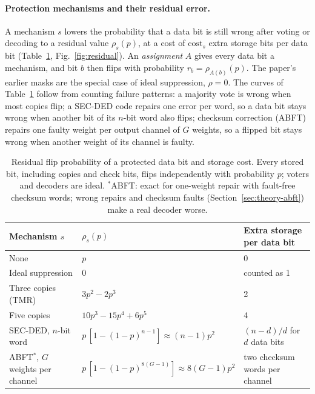 \paragraph{Protection mechanisms and their residual error.} A mechanism $s$ lowers the probability that a data bit is still wrong after voting or decoding to a residual value $\rho_s(p)$, at a cost of $\mathrm{cost}_s$ extra storage bits per data bit (Table~\ref{tab:mechanisms}, Fig.~\ref{fig:residual}). An \emph{assignment} $A$ gives every data bit a mechanism, and bit $b$ then flips with probability $r_b=\rho_{A(b)}(p)$. The paper's earlier masks are the special case of ideal suppression, $\rho=0$. The curves of Table~\ref{tab:mechanisms} follow from counting failure patterns: a majority vote is wrong when most copies flip; a SEC-DED code repairs one error per word, so a data bit stays wrong when another bit of its $n$-bit word also flips; checksum correction (ABFT) repairs one faulty weight per output channel of $G$ weights, so a flipped bit stays wrong when another weight of its channel is faulty.

\begin{table}[t]
\caption{Residual flip probability of a protected data bit and storage cost. Every stored bit, including copies and check bits, flips independently with probability $p$; voters and decoders are ideal. $^*$ABFT: exact for one-weight repair with fault-free checksum words; wrong repairs and checksum faults (Section~\ref{sec:theory-abft}) make a real decoder worse.}\label{tab:mechanisms}
\centering\small
\begin{tabular}{l l l}\toprule
Mechanism $s$ & $\rho_s(p)$ & Extra storage per data bit\\\midrule
None & $p$ & 0\\
Ideal suppression & $0$ & counted as 1\\
Three copies (TMR) & $3p^2-2p^3$ & 2\\
Five copies & $10p^3-15p^4+6p^5$ & 4\\
SEC-DED, $n$-bit word & $p\,[1-(1-p)^{n-1}]\approx(n-1)p^2$ & $(n-d)/d$ for $d$ data bits\\
ABFT$^*$, $G$ weights per channel & $p\,[1-(1-p)^{8(G-1)}]\approx 8(G-1)p^2$ & two checksum words per channel\\\bottomrule
\end{tabular}
\end{table}

